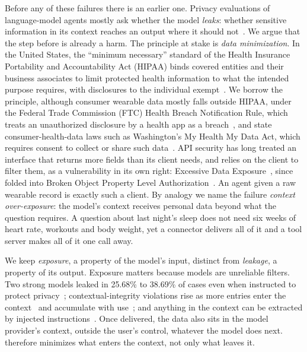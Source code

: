 Before any of these failures there is an earlier one. Privacy evaluations of language-model agents mostly ask
whether the model \emph{leaks}: whether sensitive information in its context reaches an output where it should
not~\citep{mireshghallah2024confaide,shao2024privacylens}. We argue that the step before is already a harm. The
principle at stake is \emph{data minimization}. In the United States, the ``minimum necessary'' standard of the
Health Insurance Portability and Accountability Act (HIPAA) binds covered entities and their business associates to
limit protected health information to what the intended purpose requires, with disclosures to the individual
exempt~\citep{hipaa164502}. We borrow the principle, although consumer wearable data mostly falls outside HIPAA,
under the Federal Trade Commission (FTC) Health Breach Notification Rule, which treats an unauthorized disclosure by a
health app as a breach~\citep{ftc2024hbnr}, and state consumer-health-data laws such as Washington's My Health My
Data Act, which requires consent to collect or share such data~\citep{wa2023mhmda}. API security has long treated an interface that returns more fields than its client needs, and relies on the client
to filter them, as a vulnerability in its own right: Excessive Data Exposure~\citep{owasp2019api3}, since folded into
Broken Object Property Level Authorization~\citep{owasp2023api3}. An agent given a raw wearable record is exactly
such a client. By analogy we name the failure \emph{context over-exposure}: the model's context receives personal
data beyond what the question requires. A question about last night's sleep does not need six weeks of heart rate,
workouts and body weight, yet a connector delivers all of it and a tool server makes all of it one call away.

We keep \emph{exposure}, a property of the model's input, distinct from \emph{leakage}, a property of its output.
Exposure matters because models are unreliable filters. Two strong models leaked in 25.68\% to 38.69\% of cases even
when instructed to protect privacy~\citep{shao2024privacylens}; contextual-integrity violations rise as more
entries enter the context~\citep{fu2026ciwork} and accumulate with use~\citep{mireshghallah2025cimemories}; and
anything in the context can be extracted by injected instructions~\citep{greshake2023indirect,bagdasarian2024airgap}.
Once delivered, the data also sits in the model provider's context, outside the user's control, whatever the model
does next. \sys{} therefore minimizes what enters the context, not only what leaves it.

